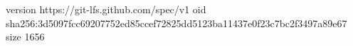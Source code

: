 version https://git-lfs.github.com/spec/v1
oid sha256:3d5097fcc69207752ed85ccef72825dd5123ba11437e0f23c7bc2f3497a89e67
size 1656
